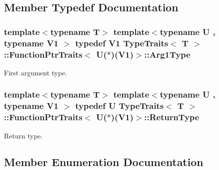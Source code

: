 \subsection{Member Typedef Documentation}
\subsubsection[{\texorpdfstring{Arg1\+Type}{Arg1Type}}]{\setlength{\rightskip}{0pt plus 5cm}template$<$typename T$>$ template$<$typename U , typename V1 $>$ typedef V1 {\bf Type\+Traits}$<$ T $>$\+::{\bf Function\+Ptr\+Traits}$<$ U($\ast$)(V1)$>$\+::{\bf Arg1\+Type}}\hypertarget{structTypeTraits_1_1FunctionPtrTraits_3_01U_07_5_08_07V1_08_4_a0508a173d3cc7b1c28b79a00c2d8aa2e}{}\label{structTypeTraits_1_1FunctionPtrTraits_3_01U_07_5_08_07V1_08_4_a0508a173d3cc7b1c28b79a00c2d8aa2e}
First argument type. 
\subsubsection[{\texorpdfstring{Return\+Type}{ReturnType}}]{\setlength{\rightskip}{0pt plus 5cm}template$<$typename T$>$ template$<$typename U , typename V1 $>$ typedef U {\bf Type\+Traits}$<$ T $>$\+::{\bf Function\+Ptr\+Traits}$<$ U($\ast$)(V1)$>$\+::{\bf Return\+Type}}\hypertarget{structTypeTraits_1_1FunctionPtrTraits_3_01U_07_5_08_07V1_08_4_a0a470d938f08f9b8daea83dec26a9051}{}\label{structTypeTraits_1_1FunctionPtrTraits_3_01U_07_5_08_07V1_08_4_a0a470d938f08f9b8daea83dec26a9051}
Return type. 

\subsection{Member Enumeration Documentation}
